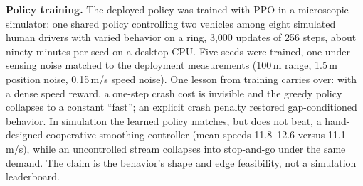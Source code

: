 \noindent\textbf{Policy training.}
The deployed policy was trained with PPO in a microscopic simulator: one shared policy controlling two vehicles among eight simulated human drivers with varied behavior on a ring, 3{,}000 updates of 256 steps, about ninety minutes per seed on a desktop CPU. Five seeds were trained, one under sensing noise matched to the deployment measurements (100\,m range, 1.5\,m position noise, 0.15\,m/s speed noise). One lesson from training carries over: with a dense speed reward, a one-step crash cost is invisible and the greedy policy collapses to a constant ``fast''; an explicit crash penalty restored gap-conditioned behavior. In simulation the learned policy matches, but does not beat, a hand-designed cooperative-smoothing controller (mean speeds 11.8--12.6 versus 11.1\,m/s), while an uncontrolled stream collapses into stop-and-go under the same demand. The claim is the behavior's shape and edge feasibility, not a simulation leaderboard.

\begin{table}[t]
\centering
\caption{Measured prototype performance on a Jetson Orin Nano developer kit. Scripted drives replay real dashcam footage with a scripted GPS profile through the live detector-to-advisory stack, paced at 30\,Hz. These numbers ground edge feasibility, not traffic-control effectiveness.}
\label{tab:jetson}
\small
{}
\end{table}

